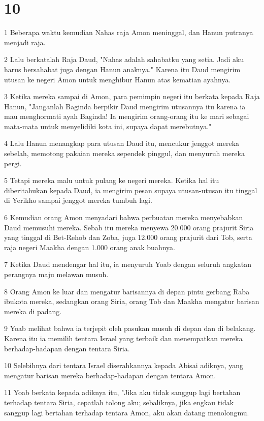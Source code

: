 \chapter{10}

\par 1 Beberapa waktu kemudian Nahas raja Amon meninggal, dan Hanun putranya menjadi raja.
\par 2 Lalu berkatalah Raja Daud, "Nahas adalah sahabatku yang setia. Jadi aku harus bersahabat juga dengan Hanun anaknya." Karena itu Daud mengirim utusan ke negeri Amon untuk menghibur Hanun atas kematian ayahnya.
\par 3 Ketika mereka sampai di Amon, para pemimpin negeri itu berkata kepada Raja Hanun, "Janganlah Baginda berpikir Daud mengirim utusannya itu karena ia mau menghormati ayah Baginda! Ia mengirim orang-orang itu ke mari sebagai mata-mata untuk menyelidiki kota ini, supaya dapat merebutnya."
\par 4 Lalu Hanun menangkap para utusan Daud itu, mencukur jenggot mereka sebelah, memotong pakaian mereka sependek pinggul, dan menyuruh mereka pergi.
\par 5 Tetapi mereka malu untuk pulang ke negeri mereka. Ketika hal itu diberitahukan kepada Daud, ia mengirim pesan supaya utusan-utusan itu tinggal di Yerikho sampai jenggot mereka tumbuh lagi.
\par 6 Kemudian orang Amon menyadari bahwa perbuatan mereka menyebabkan Daud memusuhi mereka. Sebab itu mereka menyewa 20.000 orang prajurit Siria yang tinggal di Bet-Rehob dan Zoba, juga 12.000 orang prajurit dari Tob, serta raja negeri Maakha dengan 1.000 orang anak buahnya.
\par 7 Ketika Daud mendengar hal itu, ia menyuruh Yoab dengan seluruh angkatan perangnya maju melawan musuh.
\par 8 Orang Amon ke luar dan mengatur barisannya di depan pintu gerbang Raba ibukota mereka, sedangkan orang Siria, orang Tob dan Maakha mengatur barisan mereka di padang.
\par 9 Yoab melihat bahwa ia terjepit oleh pasukan musuh di depan dan di belakang. Karena itu ia memilih tentara Israel yang terbaik dan menempatkan mereka berhadap-hadapan dengan tentara Siria.
\par 10 Selebihnya dari tentara Israel diserahkannya kepada Abisai adiknya, yang mengatur barisan mereka berhadap-hadapan dengan tentara Amon.
\par 11 Yoab berkata kepada adiknya itu, "Jika aku tidak sanggup lagi bertahan terhadap tentara Siria, cepatlah tolong aku; sebaliknya, jika engkau tidak sanggup lagi bertahan terhadap tentara Amon, aku akan datang menolongmu.
